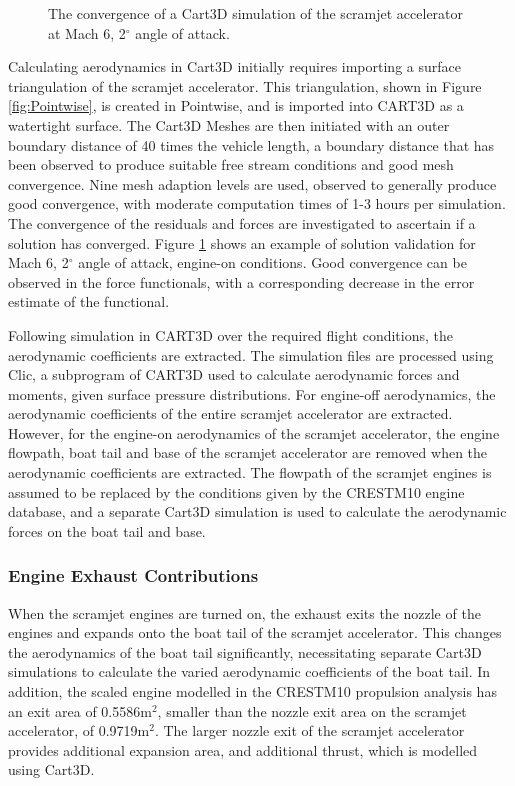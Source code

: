 \begin{figure}[ht]
\begin{subfigure}{.5\textwidth}
	\end{subfigure}
	
	\caption{The convergence of a Cart3D simulation of the scramjet accelerator at Mach 6, 2$^\circ$ angle of attack.}
	\label{fig:Cart3dValidation}
\end{figure}

Calculating aerodynamics in Cart3D initially requires importing a surface triangulation of the scramjet accelerator. This triangulation, shown in Figure \ref{fig:Pointwise}, is created in Pointwise, and is imported into CART3D as a watertight surface. 
The Cart3D Meshes are then initiated with an outer boundary distance of 40 times the vehicle length, a boundary distance that has been observed to produce suitable free stream conditions and good mesh convergence. Nine mesh adaption levels are used, observed to generally produce good convergence, with moderate computation times of 1-3 hours per simulation. The convergence of the residuals and forces are investigated to ascertain if a solution has converged. Figure \ref{fig:Cart3dValidation} shows an example of solution validation for Mach 6, 2$^\circ$ angle of attack, engine-on conditions. Good convergence can be observed in the force functionals, with a corresponding decrease in the error estimate of the functional.  

Following simulation in CART3D over the required flight conditions, the aerodynamic coefficients are extracted. The simulation files are processed using Clic, a subprogram of CART3D used to calculate aerodynamic forces and moments, given surface pressure distributions. 
For engine-off aerodynamics, the aerodynamic coefficients of the entire scramjet accelerator are extracted. However, for the engine-on aerodynamics of the scramjet accelerator, the engine flowpath, boat tail and base of the scramjet accelerator are removed when the aerodynamic coefficients are extracted. The flowpath of the scramjet engines is assumed to be replaced by the conditions given by the \textsf{CRESTM10} engine database, and a separate Cart3D simulation is used to calculate the aerodynamic forces on the boat tail and base. 



\subsubsection{Engine Exhaust Contributions}\label{sec:engine-oncart}

When the scramjet engines are turned on, the exhaust exits the nozzle of the engines and expands onto the boat tail of the scramjet accelerator. This changes the aerodynamics of the boat tail significantly, necessitating separate Cart3D simulations to calculate the varied aerodynamic coefficients of the boat tail. In addition, 
the scaled engine modelled in the \textsf{CRESTM10} propulsion analysis has an exit area of 0.5586m$^2$, smaller than the nozzle exit area on the scramjet accelerator, of 0.9719m$^2$. The larger nozzle exit of the scramjet accelerator provides additional expansion area, and additional thrust, which is modelled using Cart3D. 

